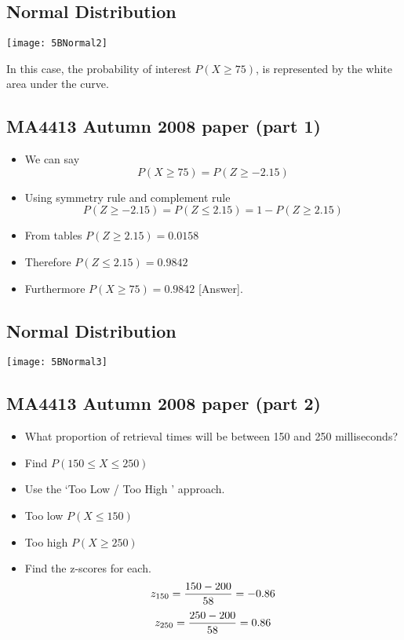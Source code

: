 {
\subsection*{Normal Distribution}

\begin{center}
\texttt{[image: 5BNormal2]}
\end{center}

In this case, the probability of interest $P(X\geq 75)$, is represented by the white area under the curve.

}

{
\subsection*{MA4413 Autumn 2008 paper (part 1)}
\begin{itemize}
\item We can say
\[ P( X \geq 75) = P( Z \geq -2.15)\]
\item Using symmetry rule and complement rule
\[ P( Z \geq -2.15) = P( Z \leq 2.15) = 1- P( Z \geq 2.15)\]
\item From tables $P( Z \geq 2.15) = 0.0158$
\item Therefore $P( Z \leq 2.15) = 0.9842$
\item Furthermore $P( X \geq 75) = \boldsymbol{0.9842}$ [Answer].
\end{itemize}
}
{
\subsection*{Normal Distribution}

\begin{center}
\texttt{[image: 5BNormal3]}
\end{center}

}
{
\subsection*{MA4413 Autumn 2008 paper (part 2)}
\begin{itemize}
\item What proportion of retrieval times will be between 150 and 250 milliseconds?
\item Find $P(150 \leq X \leq 250)$
\item Use the `Too Low / Too High ' approach.
\item Too low $P( X \leq 150)$
\item Too high $P( X \geq 250)$
\item Find the z-scores for each.
\[ z_{150} =  {150 - 200 \over 58}  = -0.86 \]
\[ z_{250} =  {250 - 200 \over 58}  = 0.86 \]
\end{itemize}
}
